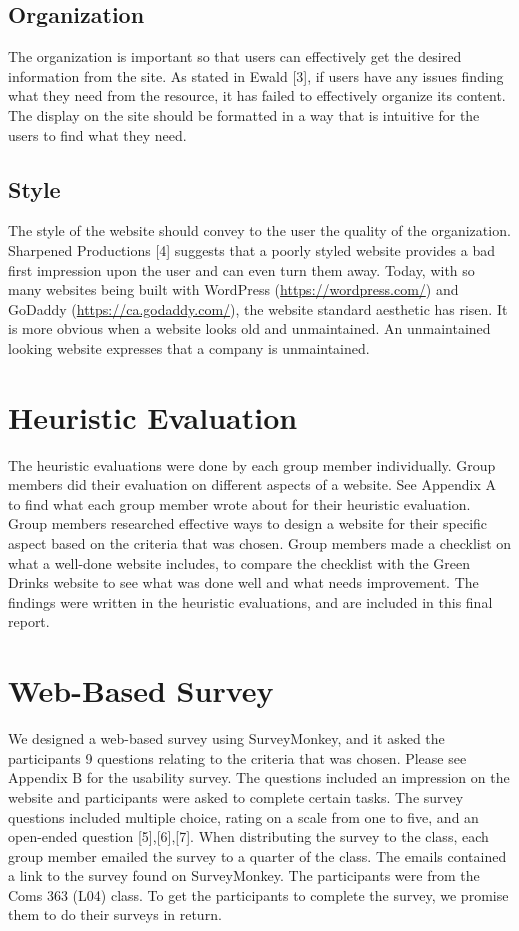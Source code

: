 \documentclass[12pt]{article}
\begin{document}
\subsection{Organization}
The organization is important so that users can effectively get the desired information from the site. As stated in Ewald [3], if users have any issues finding what they need from the resource, it has failed to effectively organize its content. The display on the site should be formatted in a way that is intuitive for the users to find what they need.
\subsection{Style}
The style of the website should convey to the user the quality of the organization. Sharpened Productions [4] suggests that a poorly styled website provides a bad first impression upon the user and can even turn them away. Today, with so many websites being built with WordPress (\url{https://wordpress.com/}) and GoDaddy (\url{https://ca.godaddy.com/}), the website standard aesthetic has risen. It is more obvious when a website looks old and unmaintained. An unmaintained looking website expresses that a company is unmaintained.
\section{Heuristic Evaluation}
The heuristic evaluations were done by each group member individually. Group members did their evaluation on different aspects of a website. See Appendix A to find what each group member wrote about for their heuristic evaluation. Group members researched effective ways to design a website for their specific aspect based on the criteria that was chosen. Group members made a checklist on what a well-done website includes, to compare the checklist with the Green Drinks website to see what was done well and what needs improvement. The findings were written in the heuristic evaluations, and are included in this final report.


\section{Web-Based Survey}
We designed a web-based survey using SurveyMonkey, and it asked the participants 9 questions relating to the criteria that was chosen. Please see Appendix B for the usability survey.  The questions included an impression on the website and participants were asked to complete certain tasks. The survey questions included multiple choice, rating on a scale from one to five, and an open-ended question [5],[6],[7]. When distributing the survey to the class, each group member emailed the survey to a quarter of the class. The emails contained a link to the survey found on SurveyMonkey. The participants were from the Coms 363 (L04) class. To get the participants to complete the survey, we promise them to do their surveys in return. 
\end{document}
